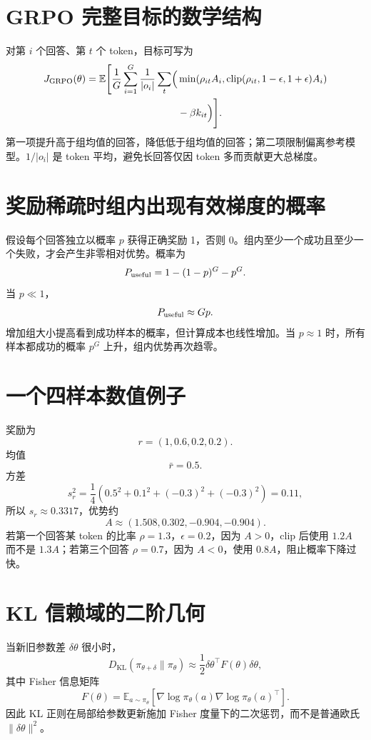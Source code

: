 \documentclass[UTF8,12pt,a4paper,fontset=none]{ctexart}
\numberwithin{equation}{section}
\newcommand{\E}{\mathbb{E}}
\newcommand{\KL}{D_{\mathrm{KL}}}
\begin{document}
\section{GRPO 完整目标的数学结构}
对第 $i$ 个回答、第 $t$ 个 token，目标可写为
\begin{align}
 J_{\rm GRPO}(\theta)=
 \E\Biggl[\frac1G\sum_{i=1}^{G}
 \frac1{|o_i|}\sum_t
 \Bigl(&\min(\rho_{it}A_i,
 \operatorname{clip}(\rho_{it},1-\epsilon,1+\epsilon)A_i)\\
 &-\beta k_{it}\Bigr)\Biggr].
\end{align}
第一项提升高于组均值的回答，降低低于组均值的回答；第二项限制偏离参考模型。$1/|o_i|$ 是 token 平均，避免长回答仅因 token 多而贡献更大总梯度。

\section{奖励稀疏时组内出现有效梯度的概率}
假设每个回答独立以概率 $p$ 获得正确奖励 1，否则 0。组内至少一个成功且至少一个失败，才会产生非零相对优势。概率为
\begin{equation}
 P_{\rm useful}=1-(1-p)^G-p^G.
\end{equation}
当 $p\ll1$，
\begin{equation}
 P_{\rm useful}\approx Gp.
\end{equation}
增加组大小提高看到成功样本的概率，但计算成本也线性增加。当 $p\approx1$ 时，所有样本都成功的概率 $p^G$ 上升，组内优势再次趋零。

\section{一个四样本数值例子}
奖励为
\begin{equation}
 r=(1,0.6,0.2,0.2).
\end{equation}
均值
\begin{equation}
 \bar r=0.5.
\end{equation}
方差
\begin{equation}
 s_r^2=\frac14(0.5^2+0.1^2+(-0.3)^2+(-0.3)^2)=0.11,
\end{equation}
所以 $s_r\approx0.3317$，优势约
\begin{equation}
 A\approx(1.508,0.302,-0.904,-0.904).
\end{equation}
若第一个回答某 token 的比率 $\rho=1.3$，$\epsilon=0.2$，因为 $A>0$，clip 后使用 $1.2A$ 而不是 $1.3A$；若第三个回答 $\rho=0.7$，因为 $A<0$，使用 $0.8A$，阻止概率下降过快。

\section{KL 信赖域的二阶几何}
当新旧参数差 $\delta\theta$ 很小时，
\begin{equation}
 \KL(\pi_{\theta+\delta}\|\pi_\theta)
 \approx\frac12\delta\theta^\top F(\theta)\delta\theta,
\end{equation}
其中 Fisher 信息矩阵
\begin{equation}
 F(\theta)=\E_{a\sim\pi_\theta}
 [\nabla\log\pi_\theta(a)\nabla\log\pi_\theta(a)^\top].
\end{equation}
因此 KL 正则在局部给参数更新施加 Fisher 度量下的二次惩罚，而不是普通欧氏 $\|\delta\theta\|^2$。
\end{document}
